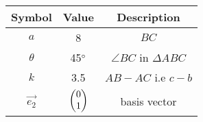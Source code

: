 \begin{tabular}{|c|c|c|}
  \hline
  \textbf{Symbol}&\textbf{Value}&\textbf{Description}\\
  \hline
  $a$ & 8 & $BC$\\
  \hline
	$\theta$ & 45$\degree{}$ & $\angle{BC}$ in $\Delta$$ABC$ \\
  \hline
	$k$ & 3.5 & $AB-AC$ i.e $c-b$ \\
  \hline 
	$\vec{e_2}$ & $\begin{pmatrix}
			0\\
			1\\
			\end{pmatrix}$ & basis vector\\
 \hline			
\end{tabular}
